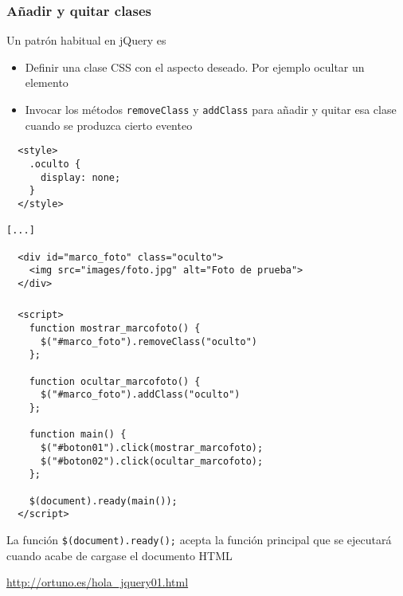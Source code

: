 \documentclass[ucs]{beamer}
\begin{document}
\begin{frame}[fragile]
\frametitle{Añadir y quitar clases}


Un patrón habitual en jQuery es
\begin{itemize}
\item
Definir una clase CSS con el aspecto deseado. Por ejemplo ocultar un elemento

\item
Invocar los métodos 
\verb|removeClass| y 
\verb|addClass| 
para añadir y quitar esa clase cuando se produzca cierto eventeo

\end{itemize}


  \begin{scriptsize}
  \begin{verbatim}
  <style>
    .oculto {
      display: none;
    }
  </style>

[...]

  <div id="marco_foto" class="oculto">
    <img src="images/foto.jpg" alt="Foto de prueba">
  </div>
  \end{verbatim}
  \end{scriptsize}


\end{frame}





\begin{frame}[fragile]
\frametitle{}

  \begin{scriptsize}
  \begin{verbatim}
  <script>
    function mostrar_marcofoto() {
      $("#marco_foto").removeClass("oculto")
    };

    function ocultar_marcofoto() {
      $("#marco_foto").addClass("oculto")
    };

    function main() {
      $("#boton01").click(mostrar_marcofoto);
      $("#boton02").click(ocultar_marcofoto);
    };

    $(document).ready(main());
  </script>
  \end{verbatim}
  \end{scriptsize}


La función
\verb|$(document).ready();|
acepta la función principal que se ejecutará cuando acabe de cargase el documento HTML

\begin{tiny}
\begin{flushright}
\url{http://ortuno.es/hola_jquery01.html}
\end{flushright}
\end{tiny}

\end{frame}
\end{document}
